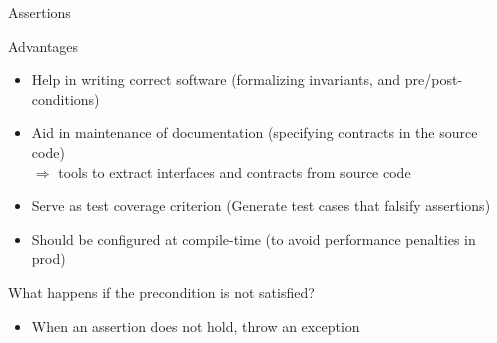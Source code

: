\begin{frame}{Assertions}

  \begin{block}{Advantages}
    \begin{itemize}
    \item Help in writing correct software 
      {\small(formalizing invariants, and pre/post-conditions)}
    \item Aid in maintenance of documentation
      {\small(specifying contracts \alert{in the source code})}\\
      $\Rightarrow$ tools to extract interfaces and contracts from source code
    \item Serve as test coverage criterion 
      {\small (Generate test cases that falsify assertions)}
    \item Should be configured at compile-time 
      {\small (to avoid performance penalties in prod)}
    \end{itemize}    
  \end{block}

  \begin{block}{What happens if the precondition is not satisfied?}
    \begin{itemize}
    \item When an assertion does not hold, throw an exception
    \end{itemize}
  \end{block}
\end{frame}
